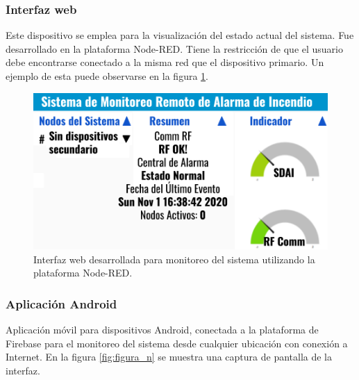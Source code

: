 \subsubsection{Interfaz web}
Este dispositivo se emplea para la visualización del estado actual del sistema. Fue desarrollado en la plataforma Node-RED. Tiene la restricción de que el usuario debe encontrarse conectado a la misma red que el dispositivo primario. Un ejemplo de esta puede observarse en la figura \ref{fig:figura_m}.


\begin{figure}[ht]
	\centering
	\includegraphics[scale=.55]{./Figures/Capitulo4/Figura_M.png}
	\caption{Interfaz web desarrollada para monitoreo del sistema utilizando la plataforma Node-RED.}
	\label{fig:figura_m}
\end{figure}

\subsubsection{Aplicación Android}
Aplicación móvil para dispositivos Android, conectada a la plataforma de Firebase para el monitoreo del sistema desde cualquier ubicación con conexión a Internet. En la figura \ref{fig:figura_n} se muestra una captura de pantalla de la interfaz.

